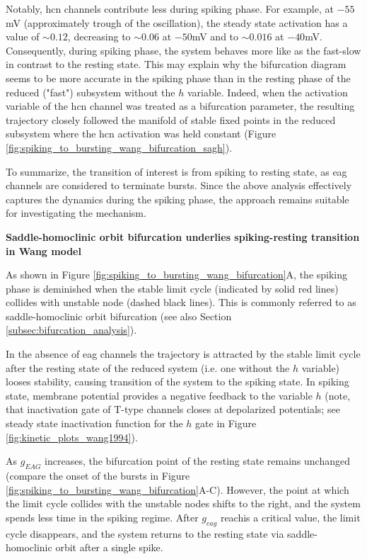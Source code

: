 \documentclass[../main.tex]{subfiles}
\begin{document}
Notably, \gls{hcn} channels contribute less during spiking phase. For example, at $-55$mV (approximately trough of the oscillation), the steady state activation has a value of $\sim 0.12$, decreasing to $\sim 0.06$ at $-50$mV and to $\sim 0.016$ at $-40$mV. Consequently, during spiking phase, the system behaves more like as the fast-slow in contrast to the resting state. This may explain why the bifurcation diagram seems to be more accurate in the spiking phase than in the resting phase of the reduced ("fast") subsystem without the $h$ variable. Indeed, when the activation variable of the \gls{hcn} channel was treated as a bifurcation parameter, the resulting trajectory closely followed the manifold of stable fixed points in the reduced subsystem where the \gls{hcn} activation was held constant (Figure \ref{fig:spiking_to_bursting_wang_bifurcation_sagh}).

To summarize, the transition of interest is from spiking to resting state, as \gls{eag} channels are considered to terminate bursts. Since the above analysis effectively captures the dynamics during the spiking phase, the approach remains suitable for investigating the mechanism.

\vspace*{0.3cm}
\noindent\textbf{Saddle-homoclinic orbit bifurcation underlies spiking-resting transition in Wang model}

As shown in Figure \ref{fig:spiking_to_bursting_wang_bifurcation}A, the spiking phase is deminished when the stable limit cycle (indicated by solid red lines) collides with unstable node (dashed black lines). This is commonly referred to as saddle-homoclinic orbit bifurcation \parencite{izhikevichDynamicalSystemsNeuroscience2006,izhikevichNEURALEXCITABILITYSPIKING2000} (see also Section \ref{subsec:bifurcation_analysis}).

In the absence of \gls{eag} channels the trajectory is attracted by the stable limit cycle after the resting state of the reduced system (i.e. one without the $h$ variable) looses stability, causing transition of the system to the spiking state. In spiking state, membrane potential provides a negative feedback to the variable $h$ (note, that inactivation gate of T-type channels closes at depolarized potentials; see steady state inactivation function for the $h$ gate in Figure \ref{fig:kinetic_plots_wang1994}).

As $g_{EAG}$ increases, the bifurcation point of the resting state remains unchanged (compare the onset of the bursts in Figure \ref{fig:spiking_to_bursting_wang_bifurcation}A-C). However, the point at which the limit cycle collides with the unstable nodes shifts to the right, and the system spends less time in the spiking regime. \color{orange} After $g_{eag}$ reachis a critical value, the limit cycle disappears, and the system returns to the resting state via saddle-homoclinic orbit after a single spike. \color{black}
\end{document}
